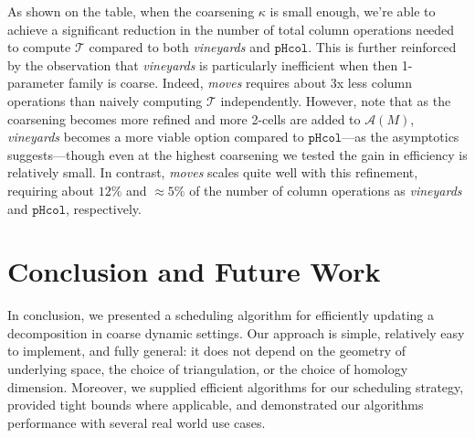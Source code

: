 \documentclass[sn-mathphys]{sn-jnl}
\begin{document}
As shown on the table, when the coarsening $\kappa$ is small enough, we're able to achieve a significant reduction in the number of total column operations needed to compute $\mathcal{T}$ compared to both \emph{vineyards} and $\mathtt{pHcol}$. %
This is further reinforced by the observation that \emph{vineyards} is particularly inefficient when then 1-parameter family is coarse. Indeed, \emph{moves} requires about 3x less column operations than naively computing $\mathcal{T}$ independently. However, note that as the coarsening becomes more refined and more 2-cells are added to $\mathcal{A}(M)$, \emph{vineyards} becomes a more viable option compared to $\mathtt{pHcol}$---as the asymptotics suggests---though even at the highest coarsening we tested the gain in efficiency is relatively small. In contrast, \emph{moves} scales quite well with this refinement, requiring about $12\%$  and $\approx 5\%$ of the number of column operations as \emph{vineyards} and $\mathtt{pHcol}$, respectively. 






\section{Conclusion and Future Work}\label{sec:conclusion}
In conclusion, we presented a scheduling algorithm for efficiently updating a decomposition in coarse dynamic settings. Our approach is simple, relatively easy to implement, and fully general: it does not depend on the geometry of underlying space, the choice of triangulation, or the choice of homology dimension. Moreover, we supplied efficient algorithms for our scheduling strategy, provided tight bounds where applicable, and demonstrated our algorithms performance with several real world use cases.
\end{document}
